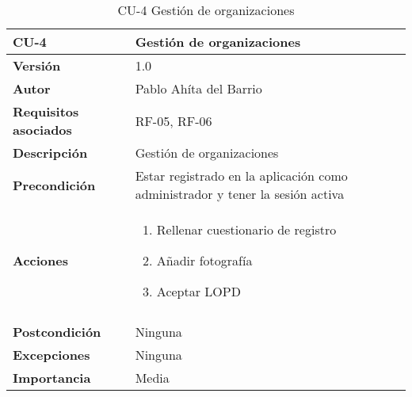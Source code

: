 \begin{table}[p]
	\centering
	\begin{tabularx}{\linewidth}{ p{} p{} }
		\toprule
		\textbf{CU-4}    & \textbf{Gestión de organizaciones}\\
		\toprule
		\textbf{Versión}              & 1.0    \\
		\textbf{Autor}                & Pablo Ahíta del Barrio \\
		\textbf{Requisitos asociados} & RF-05, RF-06\\
		\textbf{Descripción}          & Gestión de organizaciones\\
		\textbf{Precondición}         & Estar registrado en la aplicación como administrador y tener la sesión activa \\
		\textbf{Acciones}             &
		\begin{enumerate}
			\def\labelenumi{\arabic{enumi}.}
			\tightlist
			\item Rellenar cuestionario de registro
			\item Añadir fotografía 
			\item Aceptar LOPD
		\end{enumerate}\\
		\\
		\textbf{Postcondición}        & Ninguna \\
		\textbf{Excepciones}          & Ninguna \\
		\textbf{Importancia}          & Media \\
		\bottomrule
	\end{tabularx}
	\caption{CU-4 Gestión de organizaciones}
\end{table}

